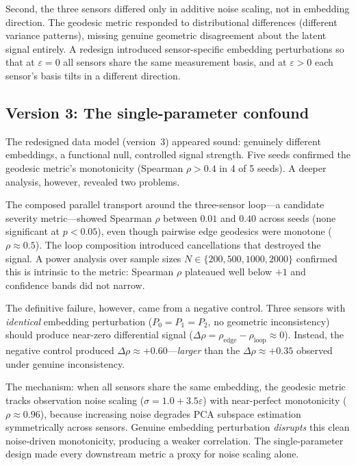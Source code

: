 \documentclass[11pt]{article}
\newcommand{\eps}{\varepsilon}
\begin{document}
Second, the three sensors differed only in additive noise scaling,
not in embedding direction.  The geodesic metric responded to
distributional differences (different variance patterns), missing
genuine geometric disagreement about the latent signal entirely.
A redesign introduced sensor-specific embedding perturbations so
that at $\eps = 0$ all sensors share the same measurement basis,
and at $\eps > 0$ each sensor's basis tilts in a different
direction.

\subsection{Version 3: The single-parameter confound}
\label{sec:v3}

The redesigned data model (version~3) appeared sound: genuinely
different embeddings, a functional null, controlled signal
strength.  Five seeds confirmed the geodesic metric's monotonicity
(Spearman $\rho > 0.4$ in 4 of 5 seeds).  A deeper analysis,
however, revealed two problems.

The composed parallel transport around the three-sensor
loop---a candidate severity metric---showed Spearman $\rho$
between $0.01$ and $0.40$ across seeds (none significant at
$p < 0.05$), even though pairwise edge geodesics were monotone
($\rho \approx 0.5$).  The loop composition introduced
cancellations that destroyed the signal.  A power analysis over
sample sizes $N \in \{200, 500, 1000, 2000\}$ confirmed this is
intrinsic to the metric: Spearman $\rho$ plateaued well below
$+1$ and confidence bands did not narrow.

The definitive failure, however, came from a negative control.
Three sensors with \emph{identical} embedding perturbation
($P_0 = P_1 = P_2$, no geometric inconsistency) should produce
near-zero differential signal ($\Delta\rho =
\rho_\mathrm{edge} - \rho_\mathrm{loop} \approx 0$).  Instead,
the negative control produced $\Delta\rho \approx
+0.60$---\emph{larger} than the $\Delta\rho \approx +0.35$
observed under genuine inconsistency.

The mechanism: when all sensors share the same embedding, the
geodesic metric tracks observation noise scaling ($\sigma = 1.0 +
3.5\eps$) with near-perfect monotonicity ($\rho \approx 0.96$),
because increasing noise degrades PCA subspace estimation
symmetrically across sensors.  Genuine embedding perturbation
\emph{disrupts} this clean noise-driven monotonicity, producing a
weaker correlation.  The single-parameter design made
every downstream metric a proxy for noise scaling alone.
\end{document}
